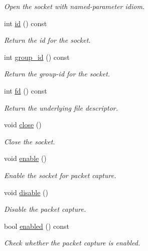 \begin{DoxyCompactItemize}
\begin{DoxyCompactList}\small\item\em Open the socket with named-\/parameter idiom. \end{DoxyCompactList}\item 
int \hyperlink{classnet_1_1pfq_a9ee042216fa93f524050a10a195935a3}{id} () const 
\begin{DoxyCompactList}\small\item\em Return the id for the socket. \end{DoxyCompactList}\item 
int \hyperlink{classnet_1_1pfq_a804ef7e3c673827799c6ade879fe5760}{group\+\_\+id} () const 
\begin{DoxyCompactList}\small\item\em Return the group-\/id for the socket. \end{DoxyCompactList}\item 
int \hyperlink{classnet_1_1pfq_a9a824d52bd660d12700f8475f04230dd}{fd} () const 
\begin{DoxyCompactList}\small\item\em Return the underlying file descriptor. \end{DoxyCompactList}\item 
void \hyperlink{classnet_1_1pfq_a3b96eb3ab597bc88142239fa840dbbe0}{close} ()
\begin{DoxyCompactList}\small\item\em Close the socket. \end{DoxyCompactList}\item 
void \hyperlink{classnet_1_1pfq_a503deb297624d708efe3ed2e4ae0a3ef}{enable} ()
\begin{DoxyCompactList}\small\item\em Enable the socket for packet capture. \end{DoxyCompactList}\item 
void \hyperlink{classnet_1_1pfq_a2396ccadb0f467760355f352fdc9d989}{disable} ()
\begin{DoxyCompactList}\small\item\em Disable the packet capture. \end{DoxyCompactList}\item 
bool \hyperlink{classnet_1_1pfq_ac1dd1a25c65ff07d8ad4d681dc0633c8}{enabled} () const 
\begin{DoxyCompactList}\small\item\em Check whether the packet capture is enabled. \end{DoxyCompactList}\item 

\end{DoxyCompactItemize}

